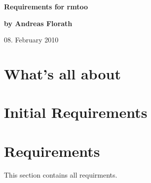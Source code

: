 \documentclass{article}
\begin{document}
\thispagestyle{empty}

\vfill

{\LARGE\textbf{Requirements for rmtoo}}

\vfill

{\Large\textbf{by Andreas Florath}}

\vfill

08. February 2010

\vfill

\newpage

\tableofcontents

\newpage

\section{What's all about}


\section{Initial Requirements}





\section{Requirements}
This section contains all requirments.


\end{document}
